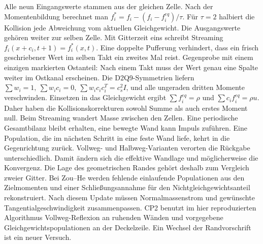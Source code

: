 \hypertarget{punkt8-3-1}{}
Alle neun Eingangswerte stammen aus der gleichen Zelle. Nach der Momentenbildung berechnet man \(f_i^*=f_i-(f_i-f_i^{eq})/\tau\). Für \(\tau=2\) halbiert die Kollision jede Abweichung vom aktuellen Gleichgewicht. Die Ausgangswerte gehören weiter zur selben Zelle.
\hypertarget{punkt8-3-2}{}
Mit Gitterzeit eins schreibt Streaming \(f_i(x+c_i,t+1)=f_i^*(x,t)\). Eine doppelte Pufferung verhindert, dass ein frisch geschriebener Wert im selben Takt ein zweites Mal reist. Gegenprobe mit einem einzigen markierten Ostanteil: Nach einem Takt muss der Wert genau eine Spalte weiter im Ostkanal erscheinen.
\hypertarget{punkt8-3-3}{}
Die D2Q9-Symmetrien liefern \(\sum w_i=1,\ \sum w_ic_i=0,\ \sum w_ic_ic_i^T=c_s^2I\), und alle ungeraden dritten Momente verschwinden. Einsetzen in das Gleichgewicht ergibt \(\sum f_i^{eq}=\rho\) und \(\sum c_if_i^{eq}=\rho u\). Daher haben die Kollisionskorrekturen sowohl Summe als auch erstes Moment null. Beim Streaming wandert Masse zwischen den Zellen. Eine periodische Gesamtbilanz bleibt erhalten, eine bewegte Wand kann Impuls zuführen.
\hypertarget{punkt8-4-1}{}
Eine Population, die im nächsten Schritt in eine feste Wand liefe, kehrt in die Gegenrichtung zurück. Vollweg- und Halbweg-Varianten verorten die Rückgabe unterschiedlich. Damit ändern sich die effektive Wandlage und möglicherweise die Konvergenz. Die Lage des geometrischen Randes gehört deshalb zum Vergleich zweier Gitter.
\hypertarget{punkt8-4-2}{}
Bei Zou–He werden fehlende einlaufende Populationen aus den Zielmomenten und einer Schließungsannahme für den Nichtgleichgewichtsanteil rekonstruiert. Nach diesem Update müssen Normalmassenstrom und gewünschte Tangentialgeschwindigkeit zusammenpassen. CP2 benutzt im hier reproduzierten Algorithmus Vollweg-Reflexion an ruhenden Wänden und vorgegebene Gleichgewichtspopulationen an der Deckelzeile. Ein Wechsel der Randvorschrift ist ein neuer Versuch.

